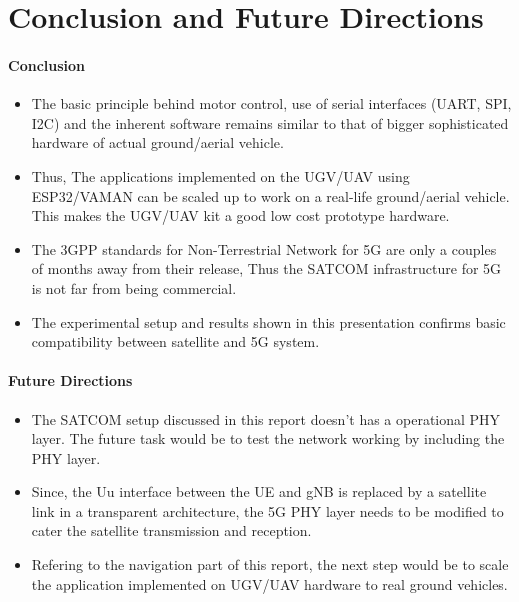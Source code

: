 \chapter{Conclusion and Future Directions}\label{chap:conclude}
\subsubsection{Conclusion}
\begin{itemize}
 \item The basic principle behind motor control, use of serial interfaces (UART, SPI, I2C) and the inherent software remains similar to that of bigger sophisticated hardware of actual ground/aerial vehicle.
	\item Thus, The applications implemented on the UGV/UAV using ESP32/VAMAN can be scaled up to work on a real-life ground/aerial vehicle. This makes the UGV/UAV kit a good low cost prototype hardware.
	\item The 3GPP standards for Non-Terrestrial Network for 5G are only a couples of months away from their release, Thus the SATCOM infrastructure for 5G is not far from being commercial. 
	\item The experimental setup and results shown in this presentation confirms basic compatibility between satellite and 5G system.
\end{itemize}
\subsubsection{Future Directions}
\begin{itemize}
	\item The SATCOM setup discussed in this report doesn't has a operational PHY layer. The future task would be to test the network working by including the PHY layer. 
	\item Since, the Uu interface between the UE and gNB is replaced by a satellite link in a transparent architecture, the 5G PHY layer needs to be modified to cater the satellite transmission and reception.
	\item Refering to the navigation part of this report, the next step would be to scale the application implemented on UGV/UAV hardware to real ground vehicles.
\end{itemize}